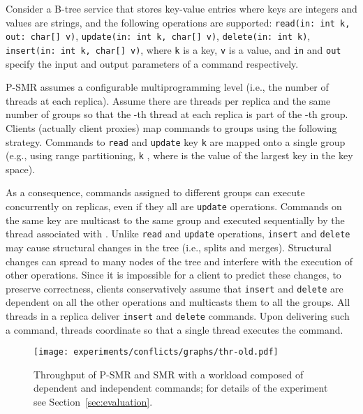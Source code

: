 \documentclass[conference]{IEEEtran}
\newcommand{\sizefactor}{0.9}
\begin{document}
Consider a B-tree service that stores key-value entries where keys are integers and values are strings, and the following operations are supported: \texttt{read(in: int k, out: char[] v)}, \texttt{update(in: int k, char[] v)}, \texttt{delete(in: int k)}, \texttt{insert(in: int k, char[] v)}, where \texttt{k} is a key, \texttt{v} is a value, and \texttt{in} and \texttt{out} specify the input and output parameters of a command respectively. 




P-SMR assumes a configurable multiprogramming level (i.e., the number of threads at each replica).
Assume there are  threads per replica and the same number of groups so that the -th thread at each replica is part of the -th group.
Clients (actually client proxies) map commands to groups using the following strategy.
Commands to \texttt{read} and \texttt{update} key \texttt{k} are mapped onto a single group  (e.g., using range partitioning,  \texttt{k} , where  is the value of the largest key in the key space).


As a consequence, commands assigned to different groups can execute concurrently on replicas, even if they all are \texttt{update} operations.
Commands on the same key are multicast to the same group  and executed sequentially by the thread associated with .
Unlike \texttt{read} and \texttt{update} operations, \texttt{insert} and \texttt{delete} may cause structural changes in the tree (i.e., splits and merges).
Structural changes can spread to many nodes of the tree and interfere with the execution of other operations. 
Since it is impossible for a client to predict these changes, to preserve correctness, clients conservatively assume that \texttt{insert} and \texttt{delete} are dependent on all the other operations and multicasts them to all the groups.
All threads in a replica deliver \texttt{insert} and \texttt{delete} commands. Upon delivering such a command, threads coordinate so that a single thread executes the command.







\begin{figure}[ht]
  \begin{center}
      \texttt{[image: experiments/conflicts/graphs/thr-old.pdf]} 
    \caption{Throughput of P-SMR and SMR with a workload composed of dependent and independent commands; for details of the experiment see Section~\ref{sec:evaluation}.}
        \label{fig:psmr-performance}
  \end{center}
\end{figure}
\end{document}

